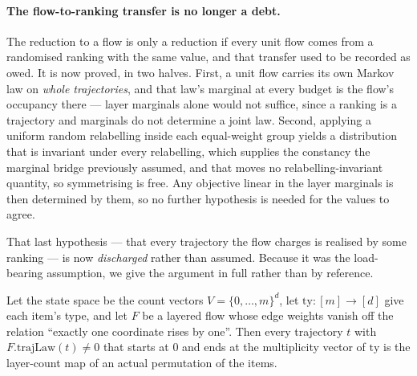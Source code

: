 \paragraph{The flow-to-ranking transfer is no longer a debt.}
The reduction to a flow is only a reduction if every unit flow comes from a randomised
ranking with the same value, and that transfer used to be recorded as owed. It is now
proved, in two halves. First, a unit flow carries its own Markov law on \emph{whole
trajectories}, and that law's marginal at every budget is the flow's occupancy there ---
layer marginals alone would not suffice, since a ranking is a trajectory and marginals do
not determine a joint law. Second, applying a uniform random relabelling inside each
equal-weight group yields a distribution that is invariant under every relabelling, which
supplies the constancy the marginal bridge previously assumed, and that moves no
relabelling-invariant quantity, so symmetrising is free. Any objective linear in the layer
marginals is then determined by them, so no further hypothesis is needed for the values to
agree.

That last hypothesis --- that every trajectory the flow charges is realised by some
ranking --- is now \emph{discharged} rather than assumed. Because it was the load-bearing
assumption, we give the argument in full rather than by reference.

\begin{proposition}
\label{prop:sec}
Let the state space be the count vectors $V=\{0,\dots,m\}^{d}$, let $\mathrm{ty}:[m]\to[d]$
give each item's type, and let $F$ be a layered flow whose edge weights vanish off the
relation ``exactly one coordinate rises by one''. Then every trajectory $t$ with
$F.\mathrm{trajLaw}(t)\ne0$ that starts at $0$ and ends at the multiplicity vector of
$\mathrm{ty}$ is the layer-count map of an actual permutation of the items.
\end{proposition}

